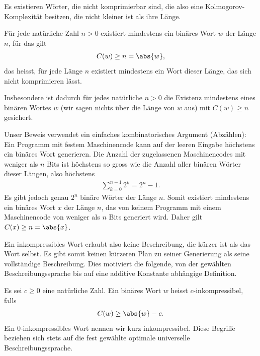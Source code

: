 Es existieren Wörter, die nicht komprimierbar sind, die also eine Kolmogorov-Komplexität besitzen, die nicht kleiner ist als ihre Länge.

\begin{mytheorem}\label{mytheorem:nichtkomprimierbar}
	Für jede natürliche Zahl $n>0$ existiert mindestens ein binäres Wort $w$ der Länge $n$, für das gilt
	\begin{align*}
		C(w)\geq n = \abs{w},
	\end{align*}
	das heisst, für jede Länge $n$ existiert mindestens ein Wort dieser Länge, das sich nicht komprimieren lässt.

	\vspace{\baselineskip}
	Insbesondere ist dadurch für jedes natürliche $n>0$ die Existenz mindestens eines binären Wortes $w$ (wir sagen nichts über die Länge von $w$ aus) mit $C(w)\geq n$ gesichert.
	\begin{myproof}
		Unser Beweis verwendet ein einfaches kombinatorisches Argument (Abzählen): Ein Programm mit festem Maschinencode kann auf der leeren Eingabe höchstens ein binäres Wort generieren. Die Anzahl der zugelassenen Maschinencodes mit weniger als $n$ Bits ist höchstens so gross wie die Anzahl aller binären Wörter dieser Längen, also höchstens
		\begin{align*}
			\sum_{k=0}^{n-1}2^k=2^n-1.
		\end{align*}
		Es gibt jedoch genau $2^n$ binäre Wörter der Länge $n$. Somit existiert mindestens ein binäres Wort $x$ der Länge $n$, das von keinem Programm mit einem Maschinencode von weniger als $n$ Bits generiert wird. Daher gilt $C(x)\geq n=\abs{x}$.
	\end{myproof}
\end{mytheorem}

Ein inkompressibles Wort erlaubt also keine Beschreibung, die kürzer ist als das Wort selbst. Es gibt somit keinen kürzeren Plan zu seiner Generierung als seine vollständige Beschreibung. Dies motiviert die folgende, von der gewählten Beschreibungssprache bis auf eine additive Konstante abhängige Definition.

\begin{mydefinition}\label{mydefinition:cincompressible}
\leavevmode
Es sei $c\geq0$ eine natürliche Zahl. Ein binäres Wort $w$ heisst $c$-inkompressibel, falls
\begin{align*}
	C(w)\geq\abs{w}-c.
\end{align*}
Ein $0$-inkompressibles Wort nennen wir kurz inkompressibel. Diese Begriffe beziehen sich stets auf die fest gewählte optimale universelle Beschreibungssprache.
\end{mydefinition}

